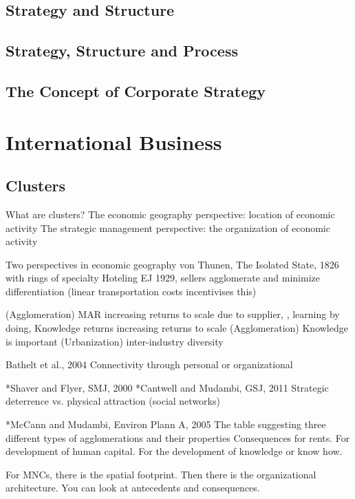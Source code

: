 \documentclass[12pt,letterpaper]{article}
\begin{document}
\subsection{Strategy and Structure}
\subsection{Strategy, Structure and Process}
\subsection{The Concept of Corporate Strategy}

\newpage

\section{International Business}

\subsection{Clusters}
What are clusters?
The economic geography perspective: location of economic activity 
The strategic management perspective: the organization of economic activity

Two perspectives in economic geography
von Thunen, The Isolated State, 1826 with rings of specialty
Hoteling EJ 1929, sellers agglomerate and minimize differentiation (linear transportation costs incentivises this)

(Agglomeration) MAR \cite{Marshall1890} increasing returns to scale due to supplier, \cite{Arrow1962}, learning by doing, \cite{Romer1986} Knowledge returns increasing returns to scale
(Agglomeration) \cite{Porter1998} Knowledge is important
(Urbanization) \cite{Jacobs1969} inter-industry diversity

Bathelt et al., 2004
\cite{Lorenzen2013}
Connectivity through personal or organizational

*Shaver and Flyer, SMJ, 2000
*Cantwell and Mudambi, GSJ, 2011
Strategic deterrence vs. physical attraction (social networks)

*McCann and Mudambi, Environ Plann A,  2005
The table suggesting three different types of agglomerations and their properties
Consequences for rents. For development of human capital. For the development of knowledge or know how.

For MNCs, there is the spatial footprint. Then there is the organizational architecture. You can look at antecedents and consequences.
\end{document}
